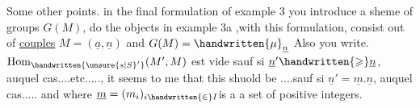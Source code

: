Some other points. in the final formulation of example 3 you introduce a sheme of groups $G(M)$,  do the objects in example 3a ,with this formulation, consist out of \uline{couples} $M=(\underline{a},\underline{n})$ and $G(M)=\handwritten{\mu}_{\underline{n}}$  Also you write. $\mathrm{Hom}_{\handwritten{\unsure{s|S}'}}(M',M)$ est vide sauf si $\underline{n}'\handwritten{\geqslant}\underline{n}$, auquel cas....etc....., it seems to me that this shuold be ....sauf si $\underline{n}'=\underline{m}.\underline{n}$, auquel cas..... and where $\underline{m}=(m_i)_{i\handwritten{\in}I}$is a a set of positive integers.

